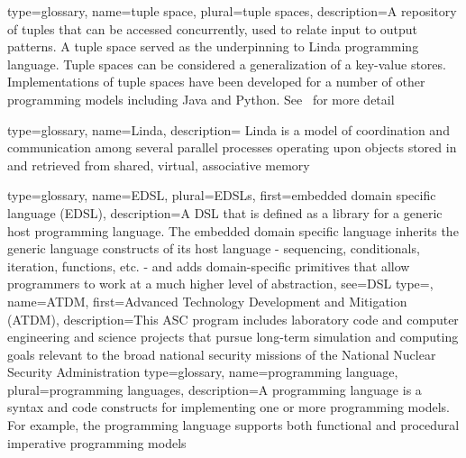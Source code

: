 {
  type={glossary},
  name={tuple space},
  plural={tuple spaces},
  description={A repository of \glspl{tuple} that can be
  accessed concurrently, used to relate input to output patterns. A tuple
  space served as the underpinning to \gls{Linda} \gls{programming
  language}. Tuple spaces can be considered a generalization of a
  \glspl{key-value store}. Implementations of tuple spaces have 
  been developed for a number of other
  programming models including Java and Python.  See~\cite{tupleSpace} for
  more detail} 
}

{
  type={glossary},
  name={Linda},
  description={ Linda is a model of coordination and communication among several parallel
      processes operating upon objects stored in and retrieved from shared,
    virtual, associative memory~\cite{Linda}}
}



{
  type=glossary,
  name={EDSL},
  plural={EDSLs},
  first={embedded domain specific language (EDSL)},
  description={A \gls{DSL} that is defined as a library for a
    generic host programming language. The embedded domain specific language
      inherits the generic language constructs of its host language -
      sequencing, conditionals, iteration, functions, etc. - and adds
      domain-specific primitives that allow programmers to work at a much
      higher level of abstraction},
  see={DSL}
}
{
  type=\acronymtype,
  name={ATDM},
  first={Advanced Technology Development and Mitigation (ATDM)},
  description={This \gls{ASC} program includes laboratory code and computer engineering and science projects that pursue long-term simulation and computing goals relevant to the broad national security missions of the National Nuclear Security Administration}
}
{
  type=glossary,
  name={programming language},
  plural={programming languages},
  description={A programming language is a syntax and code constructs for
    implementing one or more \glspl{programming model}.
  For example, the \CC{} programming language supports both \gls{functional} and
    \gls{procedural} \gls{imperative} \glspl{programming model}}
}

